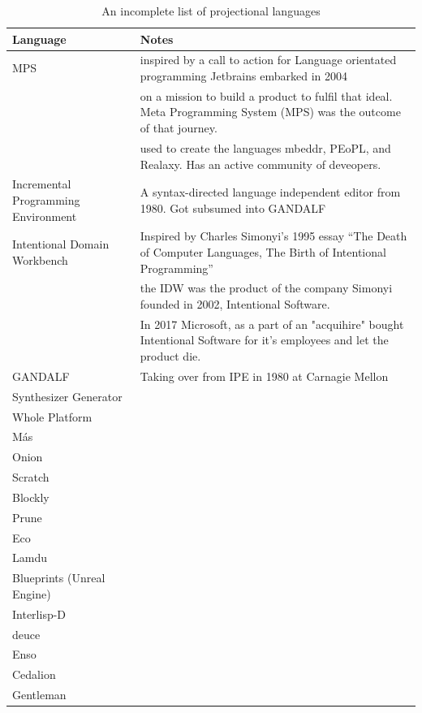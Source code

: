 \begin{table}[h]
    \begin{center}
        \begin{tabular}{ |l | l | } 
            \hline
            Language                   & Notes   \\
            \hline
            MPS & inspired by a call to action for Language orientated programming\cite{dmitriev2004language} Jetbrains embarked in 2004 \\
                & on a mission to build a product to fulfil that ideal.  Meta Programming System (MPS) was the outcome of that journey.  \\
                & used to create the languages mbeddr, PEoPL, and Realaxy.  Has an active community of deveopers. \\
            Incremental Programming Environment\cite{medina1981incremental}  & A syntax-directed language independent editor from 1980. Got subsumed into GANDALF  \\
            Intentional Domain Workbench & Inspired by Charles Simonyi's 1995 essay ``The Death of Computer Languages, The Birth of Intentional Programming''\cite{simonyi1995death}\\
                    & the IDW was the product of the company Simonyi founded in 2002, Intentional Software. \\
                    & In 2017 Microsoft, as a part of an "acquihire" bought Intentional Software for it's employees and let the product die.\\
            GANDALF\cite{NotkinDavid1985TGp} & Taking over from IPE in 1980 at Carnagie Mellon \\
            Synthesizer Generator & \\
            Whole Platform & \\
            M\'as & \\
            Onion & \\
            Scratch & \\
            Blockly & \\
            Prune & \\
            Eco & \\
            Lamdu & \\
            Blueprints (Unreal Engine) & \\
            Interlisp-D & \\
            deuce & \\
            Enso & \\
            Cedalion & \\  
            Gentleman & \\            
            \hline
        \end{tabular}
    \end{center}
    \caption{An incomplete list of projectional languages}
    \label{table:projectional_languages}
\end{table}


